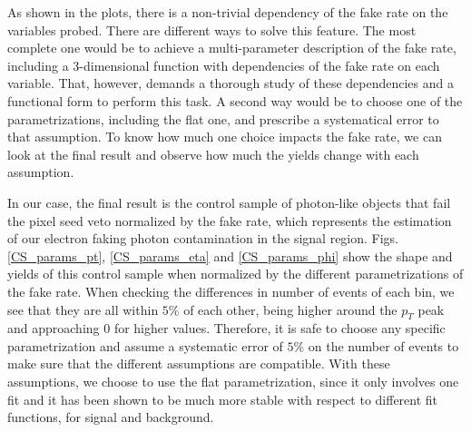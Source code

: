 As shown in the plots, there is a non-trivial dependency of the fake rate on the variables probed. There are different ways to solve this feature. The most complete one would be to achieve a multi-parameter description of the fake rate, including a 3-dimensional function with dependencies of the fake rate on each variable. That, however, demands a thorough study of these dependencies and a functional form to perform this task. A second way would be to choose one of the parametrizations, including the flat one, and prescribe a systematical error to that assumption. To know how much one choice impacts the fake rate, we can look at the final result and observe how much the yields change with each assumption.

In our case, the final result is the control sample of photon-like objects that fail the pixel seed veto normalized by the fake rate, which represents the estimation of our electron faking photon contamination in the signal region. Figs. \ref{CS_params_pt}, \ref{CS_params_eta} and \ref{CS_params_phi} show the shape and yields of this control sample when normalized by the different parametrizations of the fake rate. When checking the differences in number of events of each bin, we see that they are all within $5\%$ of each other, being higher around the $p_T$ peak and approaching $0$ for higher values. Therefore, it is safe to choose any specific parametrization and assume a systematic error of $5\%$ on the number of events to make sure that the different assumptions are compatible. With these assumptions, we choose to use the flat parametrization, since it only involves one fit and it has been shown to be much more stable with respect to different fit functions, for signal and background.



